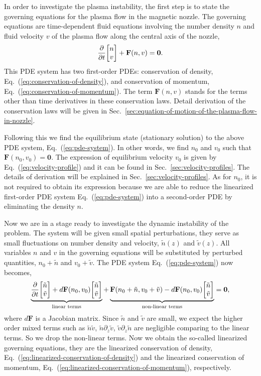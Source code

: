 In order to investigate the plasma instability, the first step is to state the governing equations for the plasma flow in the magnetic nozzle. The governing equations are time-dependent fluid equations involving the number density $n$ and fluid velocity $v$ of the plasma flow along the central axis of the nozzle,
\begin{equation}
	\pdv{t}\mqty[n\\ v] + \mathbf{F}(n,v) = \mathbf{0}.
	\label{eq:pde-system}
\end{equation}
This PDE system has two first-order PDEs: conservation of density, Eq.~(\ref{eq:conservation-of-density}), and conservation of momentum, Eq.~(\ref{eq:conservation-of-momentum}). The term $\mathbf{F}(n,v)$ stands for the terms other than time derivatives in these conservation laws. Detail derivation of the conservation laws will be given in Sec.~\ref{sec:equation-of-motion-of-the-plasma-flow-in-nozzle}.

Following this we find the equilibrium state (stationary solution) to the above PDE system, Eq.~(\ref{eq:pde-system}). In other words, we find $n_0$ and $v_0$ such that $\mathbf{F}(n_0,v_0)=\mathbf{0}$. The expression of equilibrium velocity $v_0$ is given by Eq.~(\ref{eq:velocity-profile}) and it can be found in Sec.~\ref{sec:velocity-profiles}. The details of derivation will be explained in Sec.~\ref{sec:velocity-profiles}. As for $n_0$, it is not required to obtain its expression because we are able to reduce the linearized first-order PDE system Eq.~(\ref{eq:pde-system}) into a second-order PDE by eliminating the density $n$.

Now we are in a stage ready to investigate the dynamic instability of the problem. The system will be given small spatial perturbations, they serve as small fluctuations on number density and velocity, $\tilde{n}(z)$ and $\tilde{v}(z)$. All variables $n$ and $v$ in the governing equations will be substituted by perturbed quantities, $n_0+\tilde{n}$ and $v_0+\tilde{v}$. The PDE system Eq.~(\ref{eq:pde-system}) now becomes,
\begin{equation}
	\underbrace{\pdv{t}\mqty[\tilde{n}\\ \tilde{v}] + d\mathbf{F}(n_0,v_0)\mqty[\tilde{n}\\ \tilde{v}] }_{\text{linear terms}}
	+ \underbrace{\mathbf{F}(n_0+\tilde{n}, v_0+\tilde{v}) - d\mathbf{F}(n_0,v_0)\mqty[\tilde{n}\\ \tilde{v}]}_{\text{non-linear terms}}
	= \mathbf{0},
	\label{eq:perturbed-pde-system}
\end{equation}
where $d\mathbf{F}$ is a Jacobian matrix. Since $\tilde{n}$ and $\tilde{v}$ are small, we expect the higher order mixed terms such as $\tilde{n}\tilde{v}$, $\tilde{n}\partial_z\tilde{v}$, $\tilde{v}\partial_z\tilde{n}$ are negligible comparing to the linear terms. So we drop the non-linear terms. Now we obtain the so-called linearized governing equations, they are the linearized conservation of density, Eq.~(\ref{eq:linearized-conservation-of-density}) and the linearized conservation of momentum, Eq.~(\ref{eq:linearized-conservation-of-momentum}), respectively.

